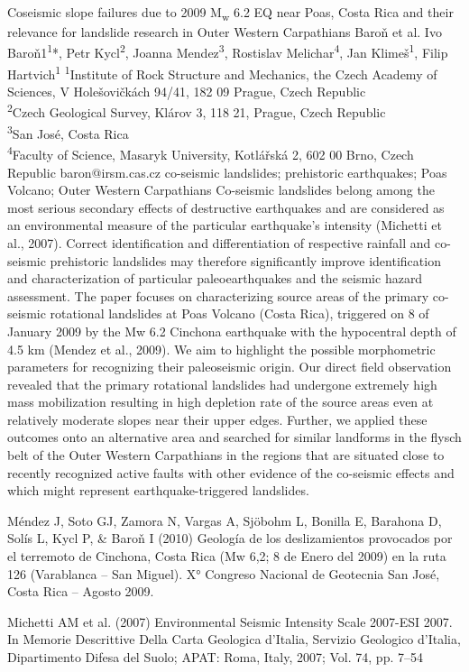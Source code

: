 \abstract
{Coseismic slope failures due to 2009 M\textsubscript{w} 6.2 EQ near Poas, Costa Rica and their relevance for landslide research in Outer Western Carpathians} 
{Baroň et al.} 
{Ivo Baroň1\textsuperscript{1}*, Petr Kycl\textsuperscript{2}, Joanna Mendez\textsuperscript{3}, Rostislav Melichar\textsuperscript{4}, Jan Klimeš\textsuperscript{1}, Filip Hartvich\textsuperscript{1}} 
{\TLtag} 
{
\textsuperscript{1}Institute of Rock Structure and Mechanics, the Czech Academy of Sciences, V Holešovičkách 94/41, 182 09 Prague, Czech Republic\\
\textsuperscript{2}Czech Geological Survey, Klárov 3, 118 21, Prague, Czech Republic\\
\textsuperscript{3}San José, Costa Rica\\
\textsuperscript{4}Faculty of Science, Masaryk University, Kotlářská 2, 602 00 Brno, Czech Republic
}
{baron@irsm.cas.cz}  %
{co-seismic landslides; prehistoric earthquakes; Poas Volcano; Outer Western Carpathians}
{Co-seismic landslides belong among the most serious secondary effects of destructive earthquakes and are considered as an environmental measure of the particular earthquake's intensity (Michetti et al., 2007). Correct identification and differentiation of respective rainfall and co-seismic prehistoric landslides may therefore significantly improve identification and characterization of particular paleoearthquakes and the seismic hazard assessment. The paper focuses on characterizing source areas of the primary co-seismic rotational landslides at Poas Volcano (Costa Rica), triggered on 8 of January 2009 by the Mw 6.2 Cinchona earthquake with the hypocentral depth of 4.5 km (Mendez et al., 2009). We aim to highlight the possible morphometric parameters for recognizing their paleoseismic origin. Our direct field observation revealed that the primary rotational landslides had undergone extremely high mass mobilization resulting in high depletion rate of the source areas even at relatively moderate slopes near their upper edges. Further, we applied these outcomes onto an alternative area and searched for similar landforms in the flysch belt of the Outer Western Carpathians in the regions that are situated close to recently recognized active faults with other evidence of the co-seismic effects and which might represent earthquake-triggered landslides.
}
{Méndez J, Soto GJ, Zamora N, Vargas A, Sjöbohm L, Bonilla E, Barahona D, Solís L, Kycl P, \& Baroň I (2010) Geología de los deslizamientos provocados por el terremoto de Cinchona, Costa Rica (Mw 6,2; 8 de Enero del 2009) en la ruta 126 (Varablanca – San Miguel). X° Congreso Nacional de Geotecnia  San José, Costa Rica -- Agosto 2009.

Michetti AM et al. (2007) Environmental Seismic Intensity Scale 2007-ESI 2007. In Memorie Descrittive Della Carta Geologica d’Italia, Servizio Geologico d’Italia, Dipartimento Difesa del Suolo; APAT: Roma, Italy, 2007; Vol. 74, pp. 7--54
}

